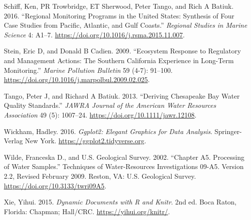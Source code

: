 \begin{CSLReferences}{1}{0}
\leavevmode{}%
Schiff, Ken, PR Trowbridge, ET Sherwood, Peter Tango, and Rich A Batiuk. 2016. {``Regional Monitoring Programs in the United States: Synthesis of Four Case Studies from Pacific, Atlantic, and Gulf Coasts.''} \emph{Regional Studies in Marine Science} 4: A1--7. \url{https://doi.org/10.1016/j.rsma.2015.11.007}.

\leavevmode{}%
Stein, Eric D, and Donald B Cadien. 2009. {``Ecosystem Response to Regulatory and Management Actions: The Southern California Experience in Long-Term Monitoring.''} \emph{Marine Pollution Bulletin} 59 (4-7): 91--100. \url{https://doi.org/10.1016/j.marpolbul.2009.02.025}.

\leavevmode{}%
Tango, Peter J, and Richard A Batiuk. 2013. {``Deriving {C}hesapeake {B}ay Water Quality Standards.''} \emph{JAWRA Journal of the American Water Resources Association} 49 (5): 1007--24. \url{https://doi.org/10.1111/jawr.12108}.

\leavevmode{}%
Wickham, Hadley. 2016. \emph{Ggplot2: Elegant Graphics for Data Analysis}. Springer-Verlag New York. \url{https://ggplot2.tidyverse.org}.

\leavevmode{}%
Wilde, Franceska D., and U.S. Geological Survey. 2002. {``Chapter A5. Processing of Water Samples.''} Techniques of Water-Resources Investigations 09-A5. Version 2.2, Revised February 2009. Reston, VA: U.S. Geological Survey. \url{https://doi.org/10.3133/twri09A5}.

\leavevmode{}%
Xie, Yihui. 2015. \emph{Dynamic Documents with {R} and Knitr}. 2nd ed. Boca Raton, Florida: Chapman; Hall/CRC. \url{https://yihui.org/knitr/}.

\end{CSLReferences}



\address{%
Marcus W. Beck\\
Tampa Bay Estuary Program\\%
263 13th Ave S\\ St.~Petersburg, Florida, USA 33701\\
%
\url{https://tbep.org}\\%
\textit{ORCiD: \href{https://orcid.org/0000-0002-4996-0059}{0000-0002-4996-0059}}\\%
\href{mailto:mbeck@tbep.org}{\nolinkurl{mbeck@tbep.org}}%
}

